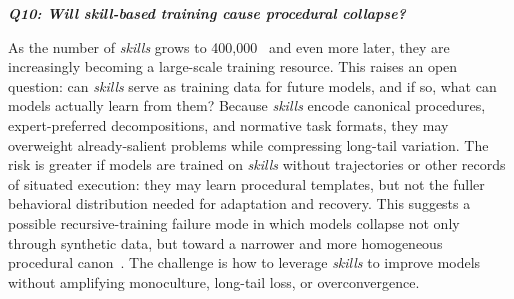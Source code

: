 \documentclass[sigconf,nonacm]{acmart}
\begin{document}
\vspace{+0.02in}
\emph{\textbf{Q10: 
Will skill-based training cause procedural collapse?}}

As the number of \emph{skills} grows to 400,000~\cite{skillsmp} and even more later, they are increasingly becoming a large-scale training resource. This raises an open question: can \emph{skills} serve as training data for future models, and if so, what can models actually learn from  them? Because \emph{skills} encode canonical procedures, expert-preferred decompositions, and normative task formats, they may overweight already-salient problems while compressing long-tail variation. The risk is greater if models are trained on \emph{skills} without trajectories or other records of situated execution: they may learn procedural templates, but not the fuller behavioral distribution needed for adaptation and recovery. This suggests a possible recursive-training failure mode in which models collapse not only through synthetic data, but toward a narrower and more homogeneous procedural canon~\cite{wu2024generative,shumailov2024ai,jiang2025artificial}. The challenge is how to leverage \emph{skills} to improve models without amplifying monoculture, long-tail loss, or overconvergence.






\end{document}
